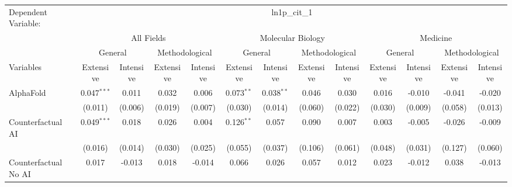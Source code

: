 \begingroup
\centering
\begin{tabular}{lcccccccccccc}
   \tabularnewline \midrule \midrule
   Dependent Variable: & \multicolumn{12}{c}{ln1p\_cit\_1}\\
 & \multicolumn{4}{c}{All Fields} & \multicolumn{4}{c}{Molecular Biology} & \multicolumn{4}{c}{Medicine} \\
\cmidrule(lr){2-5} \cmidrule(lr){6-9} \cmidrule(lr){10-13}
 & \multicolumn{2}{c}{General} & \multicolumn{2}{c}{Methodological} & \multicolumn{2}{c}{General} & \multicolumn{2}{c}{Methodological} & \multicolumn{2}{c}{General} & \multicolumn{2}{c}{Methodological} \\
\cmidrule(lr){2-3} \cmidrule(lr){4-5} \cmidrule(lr){6-7} \cmidrule(lr){8-9} \cmidrule(lr){10-11} \cmidrule(lr){12-13}
Variables & \multicolumn{1}{c}{Extensive} & \multicolumn{1}{c}{Intensive} & \multicolumn{1}{c}{Extensive} & \multicolumn{1}{c}{Intensive} & \multicolumn{1}{c}{Extensive} & \multicolumn{1}{c}{Intensive} & \multicolumn{1}{c}{Extensive} & \multicolumn{1}{c}{Intensive} & \multicolumn{1}{c}{Extensive} & \multicolumn{1}{c}{Intensive} & \multicolumn{1}{c}{Extensive} & \multicolumn{1}{c}{Intensive} \\
\cmidrule(lr){1-1}\cmidrule(lr){2-2} \cmidrule(lr){3-3} \cmidrule(lr){4-4} \cmidrule(lr){5-5} \cmidrule(lr){6-6} \cmidrule(lr){7-7} \cmidrule(lr){8-8} \cmidrule(lr){9-9} \cmidrule(lr){10-10} \cmidrule(lr){11-11} \cmidrule(lr){12-12} \cmidrule(lr){13-13}
   AlphaFold                                & 0.047$^{***}$ & 0.011   & 0.032   & 0.006   & 0.073$^{**}$   & 0.038$^{**}$   & 0.046   & 0.030   & 0.016   & -0.010        & -0.041  & -0.020\\   
                                            & (0.011)       & (0.006) & (0.019) & (0.007) & (0.030)        & (0.014)        & (0.060) & (0.022) & (0.030) & (0.009)       & (0.058) & (0.013)\\   
   Counterfactual AI                        & 0.049$^{***}$ & 0.018   & 0.026   & 0.004   & 0.126$^{**}$   & 0.057          & 0.090   & 0.007   & 0.003   & -0.005        & -0.026  & -0.009\\   
                                            & (0.016)       & (0.014) & (0.030) & (0.025) & (0.055)        & (0.037)        & (0.106) & (0.061) & (0.048) & (0.031)       & (0.127) & (0.060)\\   
   Counterfactual No AI                     & 0.017         & -0.013  & 0.018   & -0.014  & 0.066          & 0.026          & 0.057   & 0.012   & 0.023   & -0.012        & 0.038   & -0.013\\   

\end{tabular}
